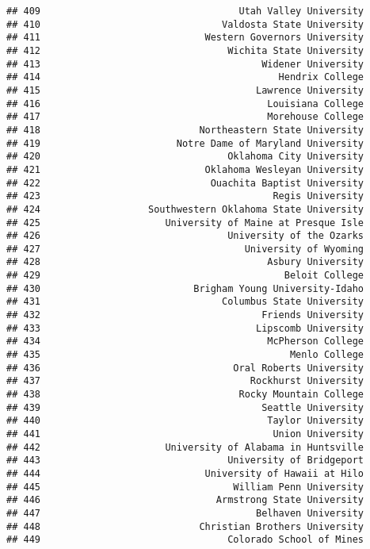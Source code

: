 \documentclass[
]{article}
\begin{document}
\begin{verbatim}
## 409                                   Utah Valley University
## 410                                Valdosta State University
## 411                             Western Governors University
## 412                                 Wichita State University
## 413                                       Widener University
## 414                                          Hendrix College
## 415                                      Lawrence University
## 416                                        Louisiana College
## 417                                        Morehouse College
## 418                            Northeastern State University
## 419                        Notre Dame of Maryland University
## 420                                 Oklahoma City University
## 421                             Oklahoma Wesleyan University
## 422                              Ouachita Baptist University
## 423                                         Regis University
## 424                   Southwestern Oklahoma State University
## 425                      University of Maine at Presque Isle
## 426                                 University of the Ozarks
## 427                                    University of Wyoming
## 428                                        Asbury University
## 429                                           Beloit College
## 430                           Brigham Young University-Idaho
## 431                                Columbus State University
## 432                                       Friends University
## 433                                      Lipscomb University
## 434                                        McPherson College
## 435                                            Menlo College
## 436                                  Oral Roberts University
## 437                                     Rockhurst University
## 438                                   Rocky Mountain College
## 439                                       Seattle University
## 440                                        Taylor University
## 441                                         Union University
## 442                      University of Alabama in Huntsville
## 443                                 University of Bridgeport
## 444                             University of Hawaii at Hilo
## 445                                  William Penn University
## 446                               Armstrong State University
## 447                                      Belhaven University
## 448                            Christian Brothers University
## 449                                 Colorado School of Mines

\end{verbatim}
\end{document}
